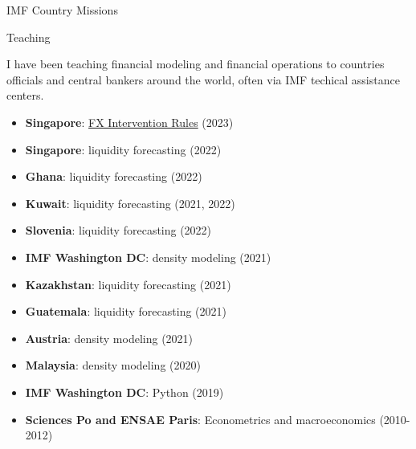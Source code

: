 \documentclass[usegeometry, 10pt, a4paper]{cv} %
\begin{document}
\begin{rubriquetableau}[0.95\textwidth]{IMF Country Missions}
\begin{multicols}{2}
\end{multicols}  
\end{rubriquetableau}


\begin{rubriquetableau}[0.95\textwidth]{Teaching}

  I have been teaching financial modeling and financial operations to countries officials and central bankers around the world, often via IMF techical assistance centers. 
  
  \begin{multicols}{2}
  
  \begin{itemize}
  \item \textbf{Singapore}: \href{https://romainlafarguette.github.io/fxinterventions/docs/index.html}{FX Intervention Rules} (2023)    
  \item \textbf{Singapore}: liquidity forecasting (2022)
  \item \textbf{Ghana}: liquidity forecasting (2022)
  \item \textbf{Kuwait}: liquidity forecasting (2021, 2022)
  \item \textbf{Slovenia}: liquidity forecasting (2022)
  \item \textbf{IMF Washington DC}: density modeling (2021)
  \item \textbf{Kazakhstan}: liquidity forecasting (2021)
  \item \textbf{Guatemala}: liquidity forecasting (2021)
  \item \textbf{Austria}: density modeling (2021)
  \item \textbf{Malaysia}: density modeling (2020)
  \item \textbf{IMF Washington DC}: Python (2019)
  \item \textbf{Sciences Po and ENSAE Paris}: Econometrics and macroeconomics (2010-2012)
  \end{itemize}
  
  \end{multicols}
\end{rubriquetableau}




\end{document}
